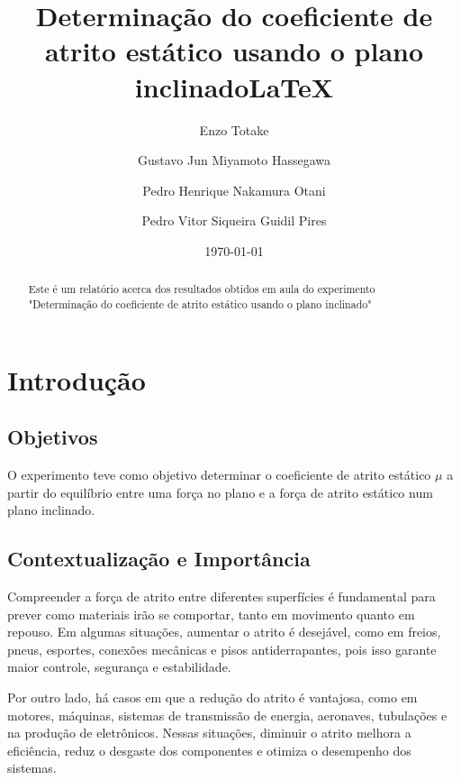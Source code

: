 \documentclass[aps,twocolumn,secnumarabic,balancelastpage,amsmath,amssymb,nofootinbib,floatfix]{revtex4-1}
\begin{document}
    \title{Determinação do coeficiente de atrito estático usando o plano inclinado\LaTeX}
    \author{Enzo Totake}
    \author{Gustavo Jun Miyamoto Hassegawa}
    \author{Pedro Henrique Nakamura Otani}
    \author{Pedro Vitor Siqueira Guidil Pires}
    \date{\today}

    \begin{abstract}
        Este é um relatório acerca dos resultados obtidos em aula do experimento "Determinação do coeficiente de atrito estático usando o plano inclinado"
    \end{abstract}
    
    \maketitle
    
    \section{Introdução} 
        \subsection{Objetivos}
        \par O experimento teve como objetivo determinar o coeficiente de atrito estático \(\mu\) a partir do equilíbrio entre uma força no plano e a força de atrito estático num plano inclinado.
        
        \subsection{Contextualização e Importância}
        \par Compreender a força de atrito entre diferentes superfícies é fundamental para prever como materiais irão se comportar, tanto em movimento quanto em repouso. Em algumas situações, aumentar o atrito é desejável, como em freios, pneus, esportes, conexões mecânicas e pisos antiderrapantes, pois isso garante maior controle, segurança e estabilidade.
        \par Por outro lado, há casos em que a redução do atrito é vantajosa, como em motores, máquinas, sistemas de transmissão de energia, aeronaves, tubulações e na produção de eletrônicos. Nessas situações, diminuir o atrito melhora a eficiência, reduz o desgaste dos componentes e otimiza o desempenho dos sistemas.
        
\end{document}
